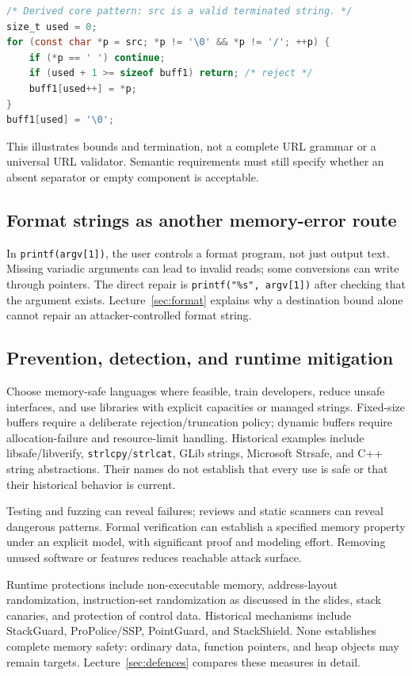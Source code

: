 \documentclass[11pt,a4paper]{article}
\numberwithin{figure}{section}
\begin{document}
\begin{lstlisting}[language=C]
/* Derived core pattern: src is a valid terminated string. */
size_t used = 0;
for (const char *p = src; *p != '\0' && *p != '/'; ++p) {
    if (*p == ' ') continue;
    if (used + 1 >= sizeof buff1) return; /* reject */
    buff1[used++] = *p;
}
buff1[used] = '\0';
\end{lstlisting}
This illustrates bounds and termination, not a complete URL grammar or a universal URL validator. Semantic requirements must still specify whether an absent separator or empty component is acceptable.

\subsection{Format strings as another memory-error route}
In \texttt{printf(argv[1])}, the user controls a format program, not just output text. Missing variadic arguments can lead to invalid reads; some conversions can write through pointers. The direct repair is \texttt{printf("\%s", argv[1])} after checking that the argument exists. Lecture~\ref{sec:format} explains why a destination bound alone cannot repair an attacker-controlled format string.

\subsection{Prevention, detection, and runtime mitigation}
Choose memory-safe languages where feasible, train developers, reduce unsafe interfaces, and use libraries with explicit capacities or managed strings. Fixed-size buffers require a deliberate rejection/truncation policy; dynamic buffers require allocation-failure and resource-limit handling. Historical examples include libsafe/libverify, \texttt{strlcpy}/\texttt{strlcat}, GLib strings, Microsoft Strsafe, and C++ string abstractions. Their names do not establish that every use is safe or that their historical behavior is current.

Testing and fuzzing can reveal failures; reviews and static scanners can reveal dangerous patterns. Formal verification can establish a specified memory property under an explicit model, with significant proof and modeling effort. Removing unused software or features reduces reachable attack surface.

Runtime protections include non-executable memory, address-layout randomization, instruction-set randomization as discussed in the slides, stack canaries, and protection of control data. Historical mechanisms include StackGuard, ProPolice/SSP, PointGuard, and StackShield. None establishes complete memory safety: ordinary data, function pointers, and heap objects may remain targets. Lecture~\ref{sec:defences} compares these measures in detail.
\end{document}

